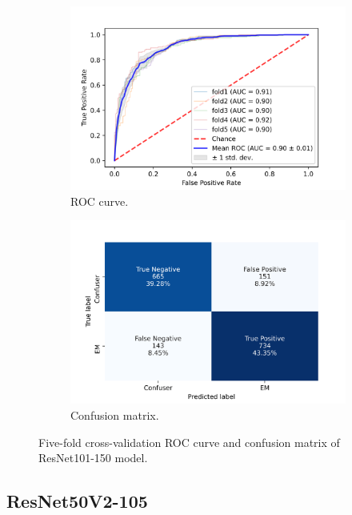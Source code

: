 \begin{figure}[h!]
	\centering
	\begin{subfigure}[b]{0.49\textwidth}
		\centering
		\includegraphics[width=\textwidth,keepaspectratio]{images/Supplement4/image76.png}
		\caption{ROC curve.}
	\end{subfigure}
	\hfill
	\begin{subfigure}[b]{0.49\textwidth}
		\centering
		\includegraphics[width=\textwidth,keepaspectratio]{images/Supplement4/image82.png}
		\caption{Confusion matrix.}
	\end{subfigure}
	\caption{Five-fold cross-validation ROC curve and confusion matrix of ResNet101-150 model.}
\end{figure}

\vfill\clearpage
\subsection{ResNet50V2-105}

